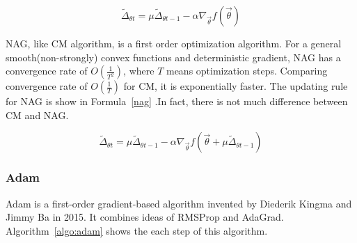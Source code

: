 \documentclass[officiallayout]{tktla}
\begin{document}
\begin{equation}
\widetilde{\Delta}_{\theta t} =  \mu \widetilde{\Delta}_{\theta {t-1}}  -\alpha \nabla_{\vec{\theta}} f(\vec{\theta})
\label{class_momentum}
\end{equation}

NAG, like CM algorithm, is a first order optimization algorithm. For a general smooth(non-strongly) convex functions and deterministic gradient, NAG has a convergence rate of $O(\frac{1}{T^2})$, where $T$ means optimization steps. Comparing convergence rate of $O(\frac{1}{T})$ for CM, it is exponentially faster. The updating rule for NAG is show in Formula~\ref{nag} .In fact, there is not much difference between CM and NAG. 

\begin{equation}
\widetilde{\Delta}_{\theta t} =  \mu \widetilde{\Delta}_{\theta {t-1}}  -\alpha \nabla_{\vec{\theta}} f(\vec{\theta} + \mu \widetilde{\Delta}_{\theta {t-1}})
\label{nag}
\end{equation}

\subsubsection{Adam}
Adam is a first-order gradient-based algorithm \cite{kingma2014adam} invented by 	Diederik Kingma and Jimmy Ba in 2015. It combines ideas of RMSProp and AdaGrad. Algorithm~\ref{algo:adam} shows the each step of this algorithm.
\end{document}
